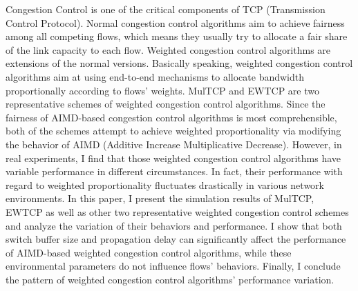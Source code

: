 \documentclass[winfonts]{njuthesis}
\begin{document}
\begin{englishabstract}
  Congestion Control is one of the critical components of TCP (Transmission Control Protocol). Normal congestion control algorithms aim to achieve fairness among all competing flows, which means they usually try to allocate a fair share of the link capacity to each flow. Weighted congestion control algorithms are extensions of the normal versions. Basically speaking, weighted congestion control algorithms aim at using end-to-end mechanisms to allocate bandwidth proportionally according to flows’ weights. MulTCP and EWTCP are two representative schemes of weighted congestion control algorithms. Since the fairness of AIMD-based congestion control algorithms is most comprehensible, both of the schemes attempt to achieve weighted proportionality via modifying the behavior of AIMD (Additive Increase Multiplicative Decrease). However, in real experiments, I find that those weighted congestion control algorithms have variable performance in different circumstances. In fact, their performance with regard to weighted proportionality fluctuates drastically in various network environments. In this paper, I present the simulation results of MulTCP, EWTCP as well as other two representative weighted congestion control schemes and analyze the variation of their behaviors and performance. I show that both switch buffer size and propagation delay can significantly affect the performance of AIMD-based weighted congestion control algorithms, while these environmental parameters do not influence flows’ behaviors. Finally, I conclude the pattern of weighted congestion control algorithms’ performance variation. 
\end{englishabstract}

%



\end{document}
